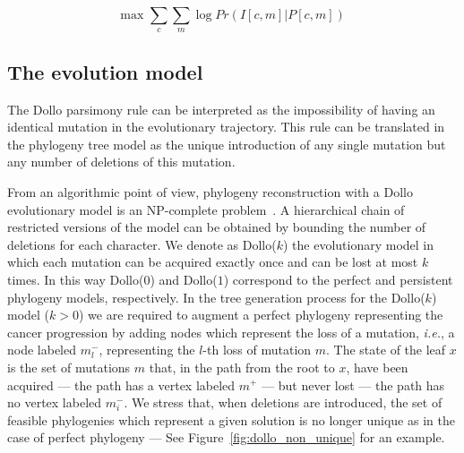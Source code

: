 \documentclass[a4paper,USenglish]{article}
\newcommand{\ie}{\emph{i.e.}}
\theoremstyle{definition}
\begin{document}
\begin{equation}
  \label{eq:log-likelihood}
  \mbox{max } \sum_c \sum_m \log Pr\left( I[c,m] | P[c,m]\right)
\end{equation}

\subsection{The evolution model}
\label{sec:intro_dollok}

The Dollo parsimony rule can be interpreted as the impossibility of
having an identical mutation in the evolutionary trajectory.  This
rule can be translated in the phylogeny tree model as the unique
introduction of any single mutation but any number of deletions of
this mutation.

From an algorithmic point of view, phylogeny reconstruction with a
Dollo evolutionary model is an NP-complete
problem~\cite{BKW95,DAY198633}.  A hierarchical chain of restricted
versions of the model can be obtained by bounding the number of
deletions for each character.  We denote as Dollo($k$) the
evolutionary model in which each mutation can be acquired exactly once
and can be lost at most $k$ times.  In this way Dollo($0$) and
Dollo($1$) correspond to the perfect and persistent phylogeny models,
respectively.  In the tree generation process for the Dollo($k$) model
($k>0$) we are required to augment a perfect phylogeny representing
the cancer progression by adding nodes which represent the loss of a
mutation, \ie, a node labeled $m^-_l$, representing the $l$-th loss
of mutation $m$.  The state of the leaf $x$ is the set of mutations
$m$ that, in the path from the root to $x$, have been acquired --- the
path has a vertex labeled $m^{+}$ --- but never lost --- the path has
no vertex labeled $m_{i}^{-}$.  We stress that, when deletions are
introduced, the set of feasible phylogenies which represent a given
solution is no longer unique as in the case of perfect phylogeny ---
See Figure~\ref{fig:dollo_non_unique} for an example.
\end{document}
